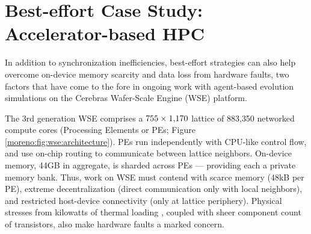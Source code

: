 \vspace{-4.0ex}
\section{Best-effort Case Study: Accelerator-based HPC}
\label{moreno:sec:case2}
\vspace{-2.0ex}



In addition to synchronization inefficiencies, best-effort strategies can also help overcome on-device memory scarcity and data loss from hardware faults, two factors that have come to the fore in ongoing work with agent-based evolution simulations on the Cerebras Wafer-Scale Engine (WSE) platform.

The 3rd generation WSE comprises a $755 \times 1{\small,}170$ lattice of 883{\small,}350 networked compute cores (Processing Elements or PEs; Figure \ref{moreno:fig:wse:architecture}).
PEs run independently with CPU-like control flow, and use on-chip routing to communicate between lattice neighbors. %
On-device memory, 44GB in aggregate, is sharded across PEs --- providing each a private memory bank.
Thus, work on WSE must contend with scarce memory (48kB per PE), extreme decentralization (direct communication only with local neighbors), and restricted host-device connectivity (only at lattice periphery).
Physical stresses from kilowatts of thermal loading \cite{la2020cerebras}, coupled with sheer component count of transistors, also make hardware faults a marked concern.

